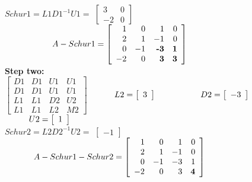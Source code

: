 $
Schur1 = L1 D1^{-1} U1 =
$
$
\left\lbrack\begin{array}{rr}
           3&           0\\
          -2&           0
\end{array}\right\rbrack
$
$
\hspace{20mm} A - Schur1 = 
\left\lbrack\begin{array}{rrrr}
           1&           0&           1&           0\\
           2&           1&          -1&           0\\
           0&          -1&  \textbf{-3}&  \textbf{1}\\
          -2&           0&   \textbf{3}&  \textbf{3}
\end{array}\right\rbrack
$\\

\noindent \textbf{Step two:}\\

$
\left\lbrack\begin{array}{rr|r|r}
          D1&          D1&          U1&          U1\\
          D1&          D1&          U1&          U1\\ \hline
          L1&          L1&          D2&          U2\\ \hline
          L1&          L1&          L2&          M2
\end{array}\right\rbrack
$
$
\hspace{10mm} L2 = 
\left\lbrack\begin{array}{r}
           3
\end{array}\right\rbrack
$
$
\hspace{18mm} D2 = 
\left\lbrack\begin{array}{r}
           -3
\end{array}\right\rbrack
$
$
\hspace{10mm} U2 = 
\left\lbrack\begin{array}{r}
           1
\end{array}\right\rbrack
$\\

$
Schur2 = L2 D2^{-1} U2 =
$
$
\left\lbrack\begin{array}{r}
           -1
\end{array}\right\rbrack
$
$
\hspace{12mm} A - Schur1 - Schur2 = 
\left\lbrack\begin{array}{rrrr}
           1&           0&           1&           0\\
           2&           1&          -1&           0\\
           0&          -1&          -3&           1\\
          -2&           0&           3&   \textbf{4}
\end{array}\right\rbrack
$\\

